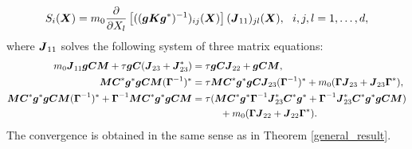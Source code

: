\begin{corollary}
 
 \begin{equation} 
S_i(\boldsymbol{X}) = m_0 \frac{\partial}{\partial X_{l}}\left[ ((\boldsymbol{g} \boldsymbol{K}\boldsymbol{g}^*)^{-1})_{ij}(\boldsymbol{X})\right] (\boldsymbol{J}_{11})_{jl}(\boldsymbol{X}), \ \
i,j,l = 1, \dots, d, \end{equation} 
where $\boldsymbol{J}_{11}$ solves the following system of three matrix equations:
\begin{align}
m_0 \boldsymbol{J}_{11} \boldsymbol{g} \boldsymbol{C} \boldsymbol{M} + \tau \boldsymbol{g} \boldsymbol{C}(\boldsymbol{J}_{23} + \boldsymbol{J}_{23}^*) &= \tau \boldsymbol{g} \boldsymbol{C} \boldsymbol{J}_{22}+\boldsymbol{g} \boldsymbol{C} \boldsymbol{M}, \label{spec1} \\
\boldsymbol{M} \boldsymbol{C}^* \boldsymbol{g}^* \boldsymbol{g} \boldsymbol{C} \boldsymbol{M} (\boldsymbol{\Gamma}^{-1})^* &= \tau \boldsymbol{M} \boldsymbol{C}^* \boldsymbol{g}^* \boldsymbol{g} \boldsymbol{C} \boldsymbol{J}_{23} (\boldsymbol{\Gamma}^{-1})^* + m_0 (\boldsymbol{\Gamma} \boldsymbol{J}_{23} + \boldsymbol{J}_{23} \boldsymbol{\Gamma}^*), \\
\boldsymbol{M} \boldsymbol{C}^* \boldsymbol{g}^*\boldsymbol{g} \boldsymbol{C} \boldsymbol{M} (\boldsymbol{\Gamma}^{-1})^* + \boldsymbol{\Gamma}^{-1} \boldsymbol{M} \boldsymbol{C}^* \boldsymbol{g}^* \boldsymbol{g} \boldsymbol{C} \boldsymbol{M} &= \tau(\boldsymbol{M} \boldsymbol{C}^* \boldsymbol{g}^* \boldsymbol{\Gamma}^{-1} \boldsymbol{J}_{23}^* \boldsymbol{C}^* \boldsymbol{g}^* + \boldsymbol{\Gamma}^{-1} \boldsymbol{J}_{23}^* \boldsymbol{C}^* \boldsymbol{g}^* \boldsymbol{g} \boldsymbol{C} \boldsymbol{M}) \nonumber \\
&\hspace{1cm} + m_0 (\boldsymbol{\Gamma} \boldsymbol{J}_{22} + \boldsymbol{J}_{22} \boldsymbol{\Gamma}^*). \label{spec3}
\end{align}
The convergence is obtained in the same sense as in Theorem \ref{general_result}. 
\end{corollary}

